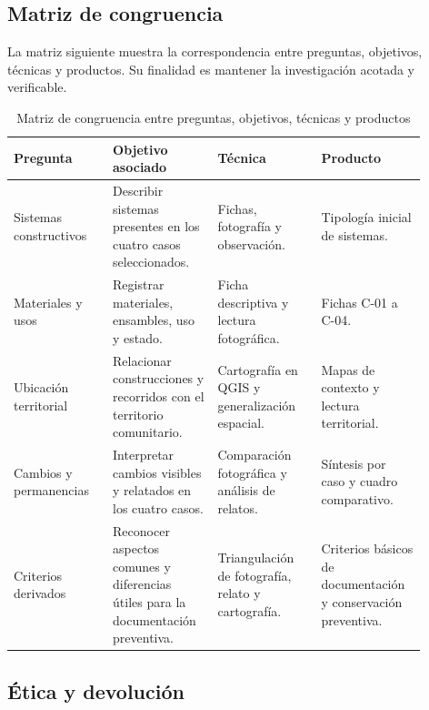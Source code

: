 \subsection{Matriz de congruencia}

La matriz siguiente muestra la correspondencia entre preguntas, objetivos, técnicas y productos. Su finalidad es mantener la investigación acotada y verificable.

\begin{table}[ht]
  \centering
  \caption{Matriz de congruencia entre preguntas, objetivos, técnicas y productos}
  \vspace{0.25cm}
  \label{tab:matriz_congruencia_metodologica}
  \begin{tabular}{@{}L{0.22\linewidth}L{0.23\linewidth}L{0.23\linewidth}L{0.22\linewidth}@{}}
    \toprule
    \textbf{Pregunta} & \textbf{Objetivo asociado} & \textbf{Técnica} & \textbf{Producto} \\
    \midrule
    Sistemas constructivos & Describir sistemas presentes en los cuatro casos seleccionados. & Fichas, fotografía y observación. & Tipología inicial de sistemas. \\
    Materiales y usos & Registrar materiales, ensambles, uso y estado. & Ficha descriptiva y lectura fotográfica. & Fichas C-01 a C-04. \\
    Ubicación territorial & Relacionar construcciones y recorridos con el territorio comunitario. & Cartografía en QGIS y generalización espacial. & Mapas de contexto y lectura territorial. \\
    Cambios y permanencias & Interpretar cambios visibles y relatados en los cuatro casos. & Comparación fotográfica y análisis de relatos. & Síntesis por caso y cuadro comparativo. \\
    Criterios derivados & Reconocer aspectos comunes y diferencias útiles para la documentación preventiva. & Triangulación de fotografía, relato y cartografía. & Criterios básicos de documentación y conservación preventiva. \\
    \bottomrule
  \end{tabular}
\end{table}

\subsection{Ética y devolución}

